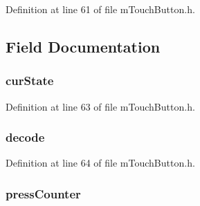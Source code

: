 Definition at line 61 of file m\+Touch\+Button.\+h.



\subsection{Field Documentation}
\hypertarget{structtag___m_t_o_u_c_h_b_u_t_t_o_n_a0d7d80e094daab6b1e4fbcbd4c408e6f}{}
\subsubsection[{cur\+State}]{ cur\+State}\label{structtag___m_t_o_u_c_h_b_u_t_t_o_n_a0d7d80e094daab6b1e4fbcbd4c408e6f}


Definition at line 63 of file m\+Touch\+Button.\+h.

\hypertarget{structtag___m_t_o_u_c_h_b_u_t_t_o_n_a0d1a1d2d83a29c80a29bccf13569a630}{}
\subsubsection[{decode}]{ decode}\label{structtag___m_t_o_u_c_h_b_u_t_t_o_n_a0d1a1d2d83a29c80a29bccf13569a630}


Definition at line 64 of file m\+Touch\+Button.\+h.

\hypertarget{structtag___m_t_o_u_c_h_b_u_t_t_o_n_ad2b17e3a502fe8732111c3773fbbbc0b}{}
\subsubsection[{press\+Counter}]{ press\+Counter}\label{structtag___m_t_o_u_c_h_b_u_t_t_o_n_ad2b17e3a502fe8732111c3773fbbbc0b}


